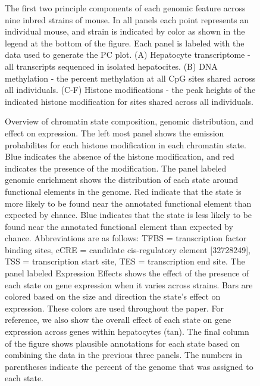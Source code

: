 \documentclass[10pt,letterpaper]{article}
\begin{document}
\begin{figure}[ht]
\centering
\caption{The first two principle components of each genomic feature across
nine inbred strains of mouse. In all panels each point represents
an individual mouse, and strain is indicated by color as shown in
the legend at the bottom of the figure. Each panel is labeled with
the data used to generate the PC plot. (A) Hepatocyte transcriptome - 
all transcripts sequenced in isolated hepatocites. (B) DNA methylation - 
the percent methylation at all CpG sites shared across all individuals. 
(C-F) Histone modifications - the peak heights of the indicated histone
modification for sites shared across all individuals.}
\label{fig:pc_plots}
\end{figure}

\begin{figure}[ht]
\centering
\caption{Overview of chromatin state composition, genomic distribution,
and effect on expression. The left most panel shows the emission
probabilites for each histone modification in each chromatin state. 
Blue indicates the absence of the histone modification, and red 
indicates the presence of the modification. The panel labeled
genomic enrichment shows the distribution of each state around 
functional elements in the genome. Red indicate that the
state is more likely to be found near the annotated functional 
element than expected by chance. Blue indicates that the state
is less likely to be found near the annotated functional element
than expected by chance. Abbreviations are as follows: TFBS = 
transcription factor binding sites, cCRE = candidate cis-regulatory
element [32728249], TSS = transcription start site, TES = transcription 
end site. The panel labeled Expression Effects shows the effect of the 
presence of each state on gene expression when it varies across strains. 
Bars are colored based on the size and direction the state's effect on
expression. These colors are used throughout the paper. For reference, 
we also show the overall effect of each state on gene expression across 
genes within hepatocytes (tan). The final column of the figure shows 
plausible annotations for each state based on combining the data in the 
previous three panels. The numbers in parentheses indicate the percent of 
the genome that was assigned to each state.}
\label{fig:state_overview}
\end{figure}
\end{document}
